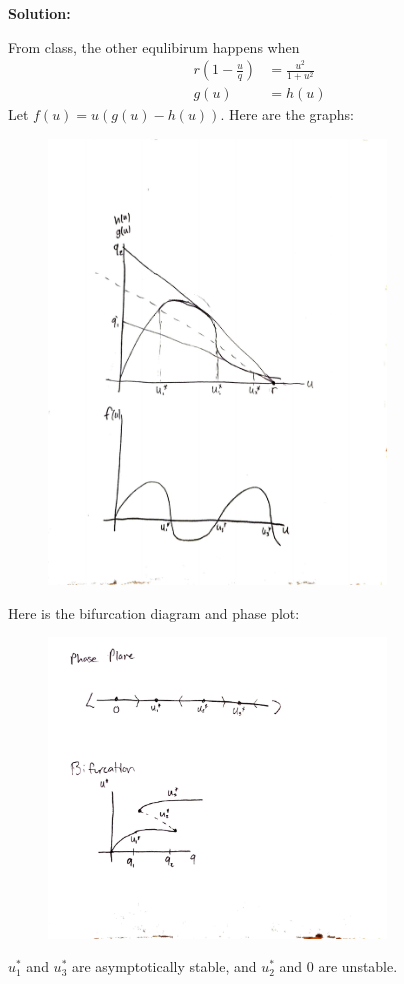 \documentclass[12pt]{article}
\newenvironment{solution}{
    \textbf{Solution:}
    
}{
    
    \vspace{2em}
}
\begin{document}
\begin{solution}
    From class, the other equlibirum happens when
    \[
        \begin{aligned}
            r \left( 1 - \frac{u}{q} \right) &= \frac{u^2}{1+u^2}\\
            g(u) &= h(u)
        \end{aligned}
    \]
    Let \(f(u) = u(g(u) - h(u))\).
    Here are the graphs:
    \begin{figure}[H]
        \centering
        \includegraphics[width=0.8\textwidth]{Graphs1.pdf}
    \end{figure}
    Here is the bifurcation diagram and phase plot:
    \begin{figure}[H]
        \centering
        \includegraphics[width=0.8\textwidth]{Graphs2.pdf}
    \end{figure}
    \(u_1^*\) and \(u_3^*\) are asymptotically stable, and \(u_2^*\) and \(0\) are unstable.
\end{solution}
\end{document}
